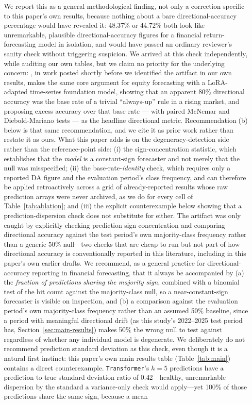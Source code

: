 \documentclass[journal]{IEEEtran}
\begin{document}
We report this as a general methodological finding, not only a correction specific to this paper's own results, because nothing about a bare directional-accuracy percentage would have revealed it: 48.37\% or 44.72\% both look like unremarkable, plausible directional-accuracy figures for a financial return-forecasting model in isolation, and would have passed an ordinary reviewer's sanity check without triggering suspicion. We arrived at this check independently, while auditing our own tables, but we claim no priority for the underlying concern: \citet{Cheung2026}, in work posted shortly before we identified the artifact in our own results, makes the same core argument for equity forecasting with a LoRA-adapted time-series foundation model, showing that an apparent 80\% directional accuracy was the base rate of a trivial ``always-up'' rule in a rising market, and proposing excess accuracy over that base rate --- with paired McNemar and Diebold-Mariano tests --- as the headline directional metric. Recommendation (b) below is that same recommendation, and we cite it as prior work rather than restate it as ours. What this paper adds is on the degeneracy-detection side rather than the reference-point side: (i) the sign-concentration statistic, which establishes that the \emph{model} is a constant-sign forecaster and not merely that the null was misspecified; (ii) the base-rate-\emph{identity} check, which requires only a reported DA figure and the evaluation period's class frequency, and can therefore be applied retroactively across a grid of already-reported results whose raw prediction arrays were never archived, as we do for every cell of Table~\ref{tab:ablation}; and (iii) the explicit counterexample below showing that a prediction-dispersion check does not substitute for either. The artifact was only caught by explicitly checking prediction sign concentration and comparing directional accuracy against the test period's own majority-class frequency rather than a generic 50\% null---two checks that are cheap to run but not part of how directional accuracy is conventionally reported in this literature, including in this paper's own earlier drafts. We recommend, as a general practice for directional-accuracy reporting in financial forecasting, that it always be accompanied by (a) the \emph{fraction of predictions sharing the majority sign}, combined with a binomial test of the hit count against the majority-class null, so a near-constant-sign forecaster is visible on inspection, and (b) a comparison against the evaluation period's own majority-class frequency rather than an assumed 50\% baseline, since a period with meaningful directional drift (as this study's 2022--2025 test period has, Section~\ref{sec:main-results}) makes 50\% the wrong null to test against regardless of whether any individual model is degenerate. We deliberately do not recommend prediction standard deviation as this check, even though it is a natural first instinct: this paper's own main results table (Table~\ref{tab:main}) contains a direct counterexample. \texttt{Transformer}'s $h=5$ predictions have a prediction-to-true standard deviation ratio of 0.42---healthy, unremarkable dispersion by the standard a variance-only check would apply---yet 100\% of those predictions share the same sign, because a mean 
\end{document}
